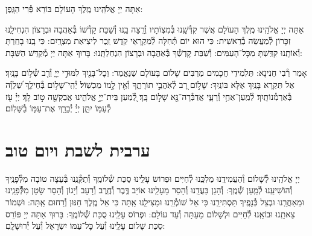 \documentclass[twoside, openany, parskip=half, 11pt]{book}
\begin{document}

אַתָּה יְיָ אֱלֹהֵֽינוּ מֶֽלֶךְ הָעוֹלָם בּוֹרֵא פְּ֯רִי הַגָּֽפֶן:

אַתָּה יְיָ אֱלֹהֵֽינוּ מֶֽלֶךְ הָעוֹלָם אֲשֶׁר קִדְּ֯שָֽׁנוּ בְּ֯מִצְוֹתָיו וְ֯רָֽצָה בָֽנוּ וְ֯שַׁבַּת קָדְ֯שׁוֹ בְּ֯אַהֲבָה וּבְרָצוֹן הִנְחִילָֽנוּ זִכָּרוֹן לְ֯מַעֲשֵׂה בְ֯רֵאשִׁית: כִּי הוּא יוֹם תְּ֯חִלָּה לְ֯מִקְרָאֵי קֹֽדֶשׁ זֵֽכֶר לִיצִיאַת מִצְרָֽיִם: כִּי בָֽנוּ בָחַֽרְתָּ וְ֯אוֹתָֽנוּ קִדַּֽשְׁתָּ מִכׇּל־הָעַמִּים: וְ֯שַׁבַּת קׇדְשְׁ֯ךָ בְּ֯אַהֲבָה וּבְרָצוֹן הִנְחַלְתָּֽנוּ: בָּרוּךְ אַתָּה יְיָ מְ֯קַדֵּשׁ הַשַּׁבָּת:

\sepline

 
אָמַר רְ֯בִי חֲנִינָא: תַּלְמִידֵי חֲכָמִים מַרְבִּים שָׁלוֹם בָּעוֹלָם שֶׁנֶּאֱמַר:
וְכׇל־בָּנַ֖יִךְ לִמּוּדֵ֣י יְיָ֑ וְ֯רַ֖ב שְׁ֯ל֥וֹם בָּנָֽיִךְ׃ אַל תִּקְרָא בָּנַֽיִךְ אֶלָּא בּוֹנַֽיִךְ: שָׁל֣וֹם רָ֭ב לְ֯אֹֽהֲבֵ֣י תוֹרָתֶ֑ךָ וְ֯אֵ֖ין לָ֣מוֹ מִכְשֽׁוֹל׃ יְ֯הִֽי־שָׁל֥וֹם בְּ֯חֵילֵ֑ךְ שַׁ֝לְוָ֗ה בְּ֯אַרְמְ֯נוֹתָֽיִךְ׃  לְ֯מַֽעַן־אַחַ֥י וְ֯רֵעָ֑י אֲדַבְּ֯רָה־נָּ֖א שָׁל֣וֹם בָּֽךְ׃ לְ֭֯מַעַן בֵּית־יְיָ֣ אֱלֹהֵ֑ינוּ אֲבַקְשָׁ֖ה ט֣וֹב לָֽךְ׃
יְיָ֗ עֹ֖ז לְ֯עַמּ֣וֹ יִתֵּ֑ן יְיָ֓ יְ֯בָרֵ֖ךְ אֶת־עַמּ֣וֹ בַ֯שָּׁלֽוֹם׃


\mournerskaddish

\vspace{\baselineskip}

{\let\clearpage\relax
\chapter[ערבית לשבת ויום טוב]{ ערבית לשבת ויום טוב }}

\barachu

\hamaarivaravim

\ahavasolam

\shema

\veahavta

\vehaya

\vayomer{}

\emesveemuna

יְיָ אֱלֹהֵֽינוּ לְ֯שָׁלוֹם וְ֯הַעֲמִידֵֽנוּ מַלְכֵּֽנוּ לְ֯חַיִּים וּפְרוֹשׂ עָלֵֽינוּ סֻכַּת שְׁ֯לוֹמֶֽךָ וְ֯תַקְּ֯נֵֽנוּ בְּ֯עֵצָה טוֹבָה מִלְּ֯פָנֶֽיךָ וְ֯הוֹשִׁיעֵֽנוּ לְ֯מַֽעַן שְׁ֯מֶֽךָ: וְ֯הָגֵן בַּעֲדֵֽנוּ וְ֯הָסֵר מֵעָלֵֽינוּ אוֹיֵב דֶּֽבֶר וְ֯חֶֽרֶב וְ֯רָעָב וְ֯יָגוֹן וְ֯הָסֵר שָׂטָן מִלְּ֯֯פָנֵֽינוּ וּמֵאַחֲרֵֽנוּ וּבְצֵל כְּ֯נָפֶֽיךָ תַּסְתִּירֵֽנוּ כִּי אֵל שׁוֹמְ֯רֵֽנוּ וּמַצִּילֵֽנוּ אַֽתָּה כִּי אֵל מֶֽלֶךְ חַנּוּן וְ֯רַחוּם אַֽתָּה:  וּשְׁמוֹר צֵאתֵֽנוּ וּבוֹאֵֽנוּ לְ֯חַיִּים וּלְשָׁלוֹם מֵעַתָּה וְ֯עַד עוֹלָם: וּפְרוֹס עָלֵֽינוּ סֻכַּת שְׁ֯לוֹמֶֽךָ: בָּרוּךְ אַתָּה יְיָ פּוֹרֵס סֻכַּת שָׁלוֹם עָלֵֽינוּ וְ֯עַל כׇּל־עַמּוֹ יִשְׂרָאֵל וְ֯עַל יְ֯רוּשָׁלָֽםִ:
\end{document}
